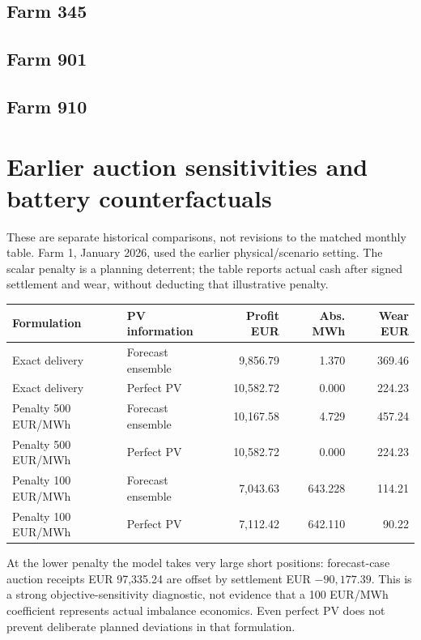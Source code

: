 \subsection{Farm 345}

\subsection{Farm 901}

\subsection{Farm 910}


\section{Earlier auction sensitivities and battery counterfactuals}
These are separate historical comparisons, not revisions to the matched
monthly table. Farm 1, January 2026, used the earlier physical/scenario setting.
The scalar penalty is a planning deterrent; the table reports actual cash
after signed settlement and wear, without deducting that illustrative penalty.
\begin{center}\small
\begin{tabular}{llrrr}
\toprule Formulation & PV information & Profit EUR & Abs. MWh & Wear EUR\\\midrule
Exact delivery & Forecast ensemble & 9,856.79 & 1.370 & 369.46\\
Exact delivery & Perfect PV & 10,582.72 & 0.000 & 224.23\\
Penalty 500 EUR/MWh & Forecast ensemble & 10,167.58 & 4.729 & 457.24\\
Penalty 500 EUR/MWh & Perfect PV & 10,582.72 & 0.000 & 224.23\\
Penalty 100 EUR/MWh & Forecast ensemble & 7,043.63 & 643.228 & 114.21\\
Penalty 100 EUR/MWh & Perfect PV & 7,112.42 & 642.110 & 90.22\\
\bottomrule\end{tabular}\end{center}
At the lower penalty the model takes very large short positions: forecast-case
auction receipts EUR 97,335.24 are offset by settlement EUR $-90,177.39$.
This is a strong objective-sensitivity diagnostic, not evidence that a
100 EUR/MWh coefficient represents actual imbalance economics. Even perfect
PV does not prevent deliberate planned deviations in that formulation.

